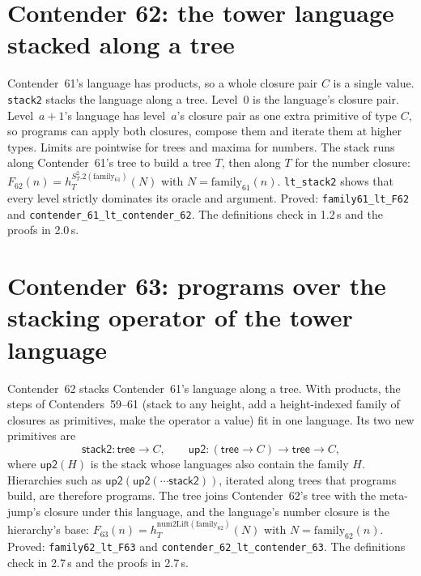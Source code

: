 \documentclass[11pt]{article}
\theoremstyle{definition}
\theoremstyle{remark}
\newcommand{\lean}[1]{\texttt{#1}}
\begin{document}
\section{Contender 62: the tower language stacked along a tree}

Contender~61's language has products, so a whole closure pair $C$ is a single
value. \lean{stack2} stacks the language along a tree. Level~0 is the language's
closure pair. Level~$a{+}1$'s language has level~$a$'s closure pair as one extra
primitive of type $C$, so programs can apply both closures, compose them and
iterate them at higher types. Limits are pointwise for trees and maxima for
numbers. The stack runs along Contender~61's tree to build a tree $T$, then
along $T$ for the number closure:
$F_{62}(n)=h^{S^2_T.2(\mathrm{family}_{61})}_T(N)$ with
$N=\mathrm{family}_{61}(n)$. \lean{lt\_stack2} shows that every level strictly
dominates its oracle and argument. Proved: \lean{family61\_lt\_F62} and
\lean{contender\_61\_lt\_\allowbreak contender\_62}. The definitions check in
1.2\,s and the proofs in 2.0\,s.

\section{Contender 63: programs over the stacking operator of the tower language}

Contender~62 stacks Contender~61's language along a tree. With products, the
steps of Contenders~59--61 (stack to any height, add a height-indexed family of
closures as primitives, make the operator a value) fit in one language. Its two
new primitives are
\[
\mathsf{stack2}:\mathsf{tree}\to C,\qquad
\mathsf{up2}:(\mathsf{tree}\to C)\to\mathsf{tree}\to C,
\]
where $\mathsf{up2}(H)$ is the stack whose languages also contain the family $H$.
Hierarchies such as $\mathsf{up2}(\mathsf{up2}(\cdots\mathsf{stack2}))$,
iterated along trees that programs build, are therefore programs. The tree joins
Contender~62's tree with the meta-jump's closure under this language, and the
language's number closure is the hierarchy's base:
$F_{63}(n)=h^{\mathrm{num2Lift}(\mathrm{family}_{62})}_T(N)$ with
$N=\mathrm{family}_{62}(n)$. Proved: \lean{family62\_lt\_F63} and
\lean{contender\_62\_lt\_\allowbreak contender\_63}. The definitions check in
2.7\,s and the proofs in 2.7\,s.

\end{document}
